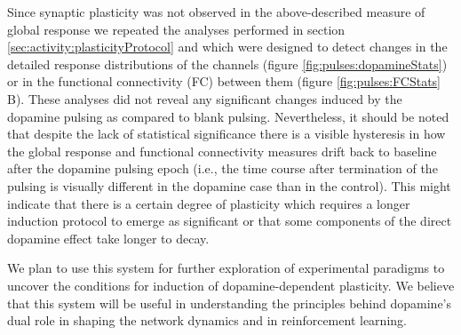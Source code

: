   Since synaptic plasticity was not observed in the above-described measure of global response we repeated the analyses performed in section \ref{sec:activity:plasticityProtocol} and which were designed to detect changes in the detailed response distributions of the channels (figure \ref{fig:pulses:dopamineStats}) or in the functional connectivity (FC) between them (figure \ref{fig:pulses:FCStats} B). These analyses did not reveal any significant changes induced by the dopamine pulsing as compared to blank pulsing. Nevertheless, it should be noted that despite the lack of statistical significance there is a visible hysteresis in how the global response and functional connectivity measures drift back to baseline after the dopamine pulsing epoch (i.e., the time course after termination of the pulsing is visually different in the dopamine case than in the control). This might indicate that there is a certain degree of plasticity which requires a longer induction protocol to emerge as significant or that some components of the direct dopamine effect take longer to decay.

  We plan to use this system for further exploration of experimental paradigms to uncover the conditions for induction of dopamine-dependent plasticity. We believe that this system will be useful in understanding the principles behind dopamine's dual role in shaping the network dynamics and in reinforcement learning.



